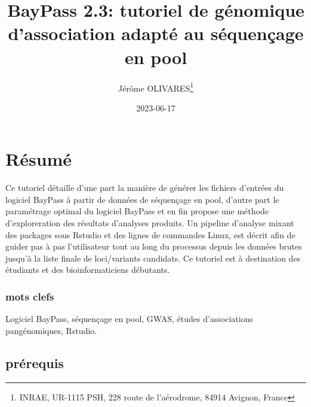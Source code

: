 \documentclass[
  openany]{book}
\title{BayPass 2.3: tutoriel de génomique d'association adapté au séquençage en pool}
\author{Jérôme OLIVARES\footnote{INRAE, UR-1115 PSH, 228 route de l'aérodrome, 84914 Avignon, France}}
\date{2023-06-17}
\theoremstyle{definition}
\theoremstyle{definition}
\theoremstyle{definition}
\theoremstyle{definition}
\theoremstyle{remark}
\begin{document}
\maketitle

{
\setcounter{tocdepth}{1}
\tableofcontents
}
\hypertarget{ruxe9sumuxe9}{%
\chapter*{Résumé}\label{ruxe9sumuxe9}}

Ce tutoriel détaille d'une part la manière de générer les fichiers d'entrées du logiciel BayPass à partir de données de séquençage en pool, d'autre part le paramétrage optimal du logiciel BayPass et en fin propose une méthode d'exploreration des résultats d'analyses produits. Un pipeline d'analyse mixant des packages sous Rstudio et des lignes de commandes Linux, est décrit afin de guider pas à pas l'utilisateur tout au long du processus depuis les données brutes jusqu'à la liste finale de loci/variants candidats.
Ce tutoriel est à destination des étudiants et des bioinformaticiens débutants.

\hypertarget{mots-clefs}{%
\subsection*{mots clefs}\label{mots-clefs}}

Logiciel BayPass, séquençage en pool, GWAS, études d'associations pangénomiques, Rstudio.

\hypertarget{pruxe9requis}{%
\section*{prérequis}\label{pruxe9requis}}
\end{document}
